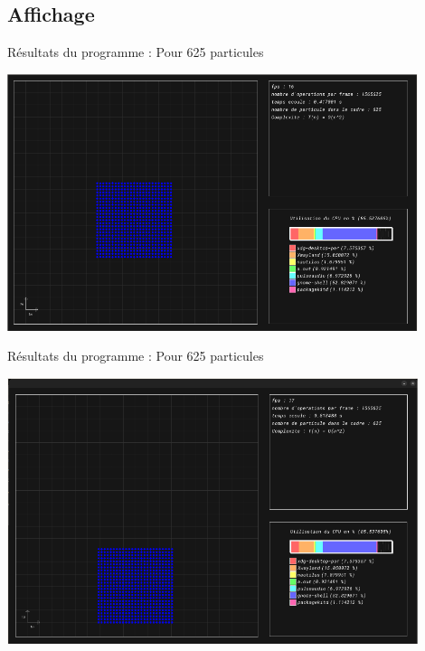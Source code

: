 \documentclass{article}
\begin{document}
\newpage
\vspace*{2pt}
\thispagestyle{landscape}
\subsection{Affichage}
Résultats du programme : Pour 625 particules 
\begin{center}
    \includegraphics[width=0.9\textwidth]{R_Frame1.png}
\end{center}

\newpage
\vspace*{2pt}
\thispagestyle{landscape}
Résultats du programme : Pour 625 particules 
\begin{center}
    \includegraphics[width=0.9\textwidth]{R_Frame2.png}
\end{center}
\end{document}

